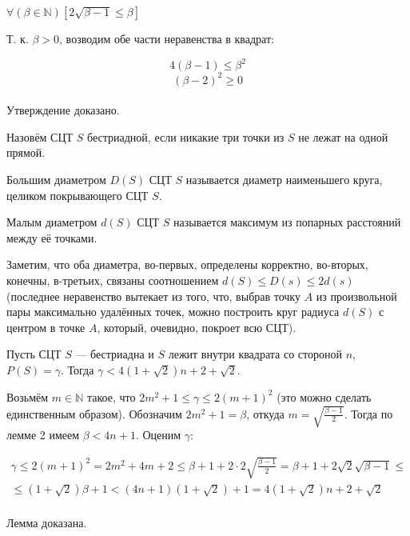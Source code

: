 \begin{utverzhd}[вспомогательное]
	$\forall \left(\beta \in \mathbb N\right)\left[  2 \sqrt{\beta - 1} \leq \beta \right]$
\end{utverzhd}

\dokvo
	Т. к. $\beta >0$, возводим обе части неравенства в квадрат:

	$$4 (\beta - 1) \leq \beta^2$$
	$$ (\beta-2)^2 \geq 0$$
\\ Утверждение доказано.

\begin{opr}
	Назовём СЦТ $S$ бестриадной, если никакие три точки из $S$ не лежат на одной прямой.
\end{opr}

\begin{opr}
	Большим диаметром $D(S)$ СЦТ $S$ называется диаметр наименьшего круга, целиком покрывающего СЦТ $S$.
\end{opr}

\begin{opr}
	Малым диаметром $d(S)$ СЦТ $S$ называется максимум из попарных расстояний между её точками.
\end{opr}

Заметим, что оба диаметра, во-первых, определены корректно, во-вторых, конечны, в-третьих, связаны соотношением $d(S)\leq D(s) \leq 2d(s)$ (последнее неравенство вытекает из того, что, выбрав точку $A$ из произвольной пары максимально удалённых точек, можно построить круг радиуса $d(S)$ с центром в точке $A$, который, очевидно, покроет всю СЦТ).


\begin{lemma}
	Пусть СЦТ $S$ --- бестриадна и $S$ лежит внутри квадрата со стороной $n$, $P(S)=\gamma$.
	Тогда $\gamma<4(1+\sqrt{2})n+2+\sqrt{2}$.
\end{lemma}

\dokvo
	Возьмём $m \in \mathbb{N}$ такое, что $2m^2+1 \le \gamma \le 2(m+1)^2$ (это можно сделать единственным образом).
	Обозначим $2m^2+1=\beta$, откуда $m=\sqrt{\frac{\beta-1}{2}}$. Тогда по лемме 2 имеем $ \beta < 4n +1$. Оценим $\gamma$:

	\begin{multline}
		\gamma \le 2(m+1)^2 = 2m^2+4m +2 \leq
		\beta + 1 + 2 \cdot 2 \sqrt{\frac{\beta-1}{2}} =
		\beta + 1 +2\sqrt{2}\sqrt{\beta-1} \leq
		\\ \leq
		(1+\sqrt{2})\beta+1 <
		(4n+1)(1+\sqrt{2})+1 =
		4(1+\sqrt{2})n+2+\sqrt{2}
	\end{multline}
\\ Лемма доказана.

